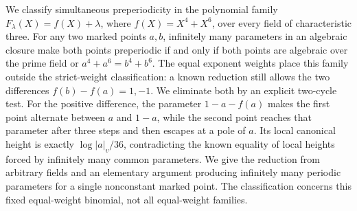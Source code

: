 We classify simultaneous preperiodicity in the polynomial family
$F_\lambda(X)=f(X)+\lambda$, where $f(X)=X^4+X^6$, over every field
of characteristic three.
For any two marked points $a,b$, infinitely many parameters in an
algebraic closure make both points preperiodic if and only if both
points are algebraic over the prime field or $a^4+a^6=b^4+b^6$.
The equal exponent weights place this family outside the strict-weight
classification: a known reduction still allows the two differences
$f(b)-f(a)=1,-1$. We eliminate both by an explicit two-cycle test.
For the positive difference, the parameter $1-a-f(a)$ makes the first
point alternate between $a$ and $1-a$, while the second point reaches
that parameter after three steps and then escapes at a pole of $a$.
Its local canonical height is exactly $\log|a|_v/36$, contradicting
the known equality of local heights forced by infinitely many common
parameters. We give the reduction from arbitrary fields and an
elementary argument producing infinitely many periodic parameters for
a single nonconstant marked point. The classification concerns this
fixed equal-weight binomial, not all equal-weight families.
